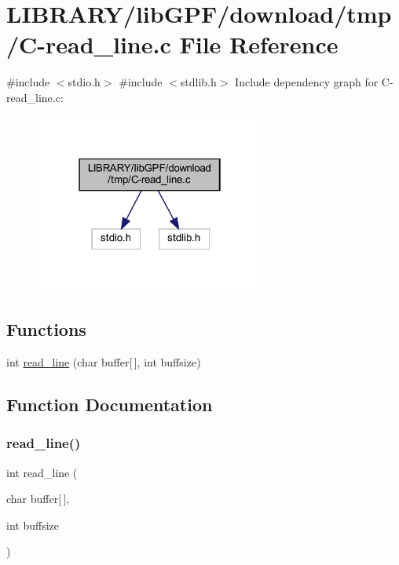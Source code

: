 \hypertarget{C-read__line_8c}{}\section{L\+I\+B\+R\+A\+R\+Y/lib\+G\+P\+F/download/tmp/\+C-\/read\+\_\+line.c File Reference}
\label{C-read__line_8c}
{\ttfamily \#include $<$stdio.\+h$>$}\newline
{\ttfamily \#include $<$stdlib.\+h$>$}\newline
Include dependency graph for C-\/read\+\_\+line.c\+:
\nopagebreak
\begin{figure}[H]
\begin{center}
\leavevmode
\includegraphics[width=214pt]{C-read__line_8c__incl}
\end{center}
\end{figure}
\subsection*{Functions}
\begin{DoxyCompactItemize}
\item 
int \hyperlink{C-read__line_8c_aa70fff09f4f198b81612596f3c466af1}{read\+\_\+line} (char buffer\mbox{[}$\,$\mbox{]}, int buffsize)
\end{DoxyCompactItemize}


\subsection{Function Documentation}
\mbox{\label{C-read__line_8c_aa70fff09f4f198b81612596f3c466af1}} 
\subsubsection{\texorpdfstring{read\+\_\+line()}{read\_line()}}
{\footnotesize\ttfamily int read\+\_\+line (\begin{DoxyParamCaption}\item[{char}]{buffer\mbox{[}$\,$\mbox{]},  }\item[{int}]{buffsize }\end{DoxyParamCaption})}



